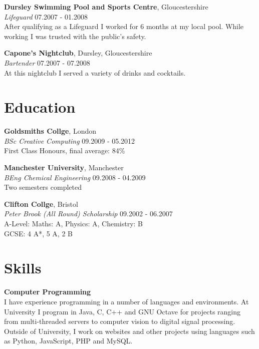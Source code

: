 \documentclass[margin,line,a4paper]{resume}
\begin{document}
\begin{resume}
\textbf{Dursley Swimming Pool and Sports Centre}, Gloucestershire  \vspace{1mm}\\
\textsl{Lifeguard} \hfill 07.2007 - 01.2008 \vspace{2mm} \\
After qualifying as a Lifeguard I worked for 6 months at my local pool. While working I was trusted with the public's safety.

\textbf{Capone's Nightclub}, Dursley, Gloucestershire  \vspace{1mm}\\
\textsl{Bartender} \hfill 07.2007 - 07.2008 \vspace{2mm} \\
At this nightclub I served a variety of drinks and cocktails.

\section{\mysidestyle Education}

\textbf{Goldsmiths Collge}, London \vspace{1mm}\\
\textsl{BSc Creative Computing} \hfill 09.2009 - 05.2012 \vspace{2mm} \\
First Class Honours, final average: 84\%

\textbf{Manchester University}, Manchester \vspace{1mm}\\
\textsl{BEng Chemical Engineering} \hfill 09.2008 - 04.2009 \vspace{2mm} \\
Two semesters completed 

\textbf{Clifton Collge}, Bristol \vspace{1mm}\\
\textsl{Peter Brook (All Round) Scholarship} \hfill 09.2002 - 06.2007 \vspace{2mm} \\
A-Level: Maths: A, Physics: A, Chemistry: B \\
GCSE: 4 A*, 5 A, 2 B \\


\section{\mysidestyle Skills}

\textbf{Computer Programming} \vspace{1mm} \\
I have experience programming in a number of languages and environments. At University I program in Java, C, C++ and GNU Octave for projects ranging from multi-threaded servers to computer vision to digital signal processing. Outside of University, I work on websites and other projects using languages such as Python, JavaScript, PHP and MySQL.


\end{resume}
\end{document}
